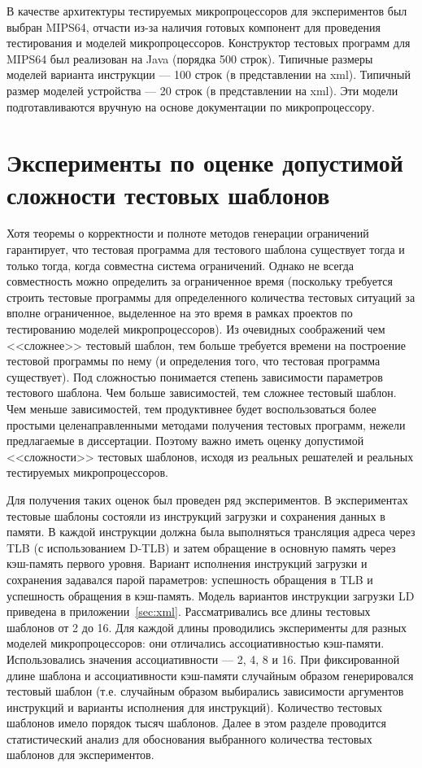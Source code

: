 В качестве архитектуры тестируемых микропроцессоров для экспериментов был выбран MIPS64, отчасти из-за наличия готовых компонент для проведения тестирования и моделей микропроцессоров. Конструктор тестовых программ для MIPS64 был реализован на Java (порядка 500 строк). Типичные размеры моделей варианта инструкции --- 100 строк (в представлении на xml). Типичный размер моделей устройства --- 20 строк (в представлении на xml). Эти модели подготавливаются вручную на основе документации по микропроцессору.

\section{Эксперименты по оценке допустимой сложности тестовых шаблонов}\label{sec:templates_estimation}


Хотя теоремы о корректности и полноте методов генерации ограничений гарантирует, что тестовая программа для тестового шаблона существует тогда и только тогда, когда совместна система ограничений. Однако не всегда совместность можно определить за ограниченное время (поскольку требуется строить тестовые программы для определенного количества тестовых ситуаций за вполне ограниченное, выделенное на это время в рамках проектов по тестированию моделей микропроцессоров). Из очевидных соображений чем <<сложнее>> тестовый шаблон, тем больше требуется времени на построение тестовой программы по нему (и определения того, что тестовая программа существует). Под сложностью понимается степень зависимости параметров тестового шаблона. Чем больше зависимостей, тем сложнее тестовый шаблон. Чем меньше зависимостей, тем продуктивнее будет воспользоваться более простыми целенаправленными методами получения тестовых программ, нежели предлагаемые в диссертации. Поэтому важно иметь оценку допустимой <<сложности>> тестовых шаблонов, исходя из реальных решателей и реальных тестируемых микропроцессоров.

Для получения таких оценок был проведен ряд экспериментов. В экспериментах тестовые шаблоны состояли из инструкций загрузки и сохранения
данных в памяти. В каждой инструкции должна была выполняться трансляция адреса
через TLB (с использованием D-TLB) и затем обращение в основную память через
кэш-память первого уровня. Вариант исполнения инструкций загрузки и сохранения задавался парой параметров: успешность обращения в TLB и успешность обращения в кэш-память. Модель вариантов инструкции загрузки LD приведена в приложении~\ref{sec:xml}. Рассматривались все длины тестовых шаблонов от 2 до
16. Для каждой длины проводились эксперименты для разных моделей микропроцессоров: они отличались ассоциативностью кэш-памяти. Использовались значения ассоциативности --- 2, 4, 8 и 16. При фиксированной длине шаблона и ассоциативности кэш-памяти случайным образом генерировался тестовый шаблон (т.е. случайным образом выбирались зависимости аргументов инструкций и варианты исполнения для инструкций). Количество тестовых шаблонов имело порядок тысяч шаблонов. Далее в этом разделе проводится статистический анализ для обоснования выбранного количества тестовых шаблонов для экспериментов.

